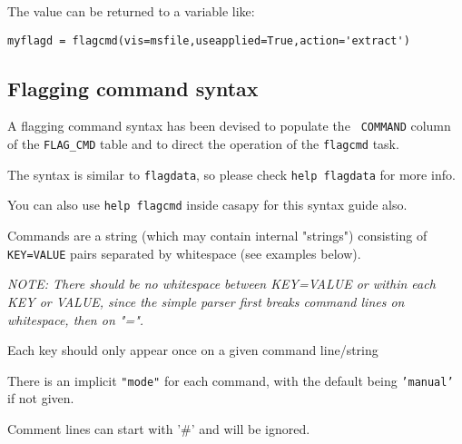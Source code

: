 The value can be returned to a variable like: 

\small
\begin{verbatim}
myflagd = flagcmd(vis=msfile,useapplied=True,action='extract')
\end{verbatim}
\normalsize


\subsection{Flagging command syntax}
\label{section:edit.flagcmd.syntax}

A flagging command syntax has been devised to populate the {\tt
COMMAND} column of the {\tt FLAG\_CMD} table and to direct the 
operation of the {\tt flagcmd} task.

The syntax is similar to {\tt flagdata}, so please check {\tt help
  flagdata} for more info. 

You can also use {\tt help flagcmd} inside casapy for this syntax guide also.

Commands are a string (which may contain internal "strings")
consisting of {\tt KEY=VALUE} pairs separated by whitespace (see examples
below).

{\it NOTE: There should be no whitespace between KEY=VALUE or within each
KEY or VALUE, since the simple parser first breaks command lines on
whitespace, then on "=".}
        
Each key should only appear once on a given command line/string
        
There is an implicit {\tt "mode"} for each command, with the default being
{\tt 'manual'} if not given.

Comment lines can start with '\#' and will be ignored.
     

